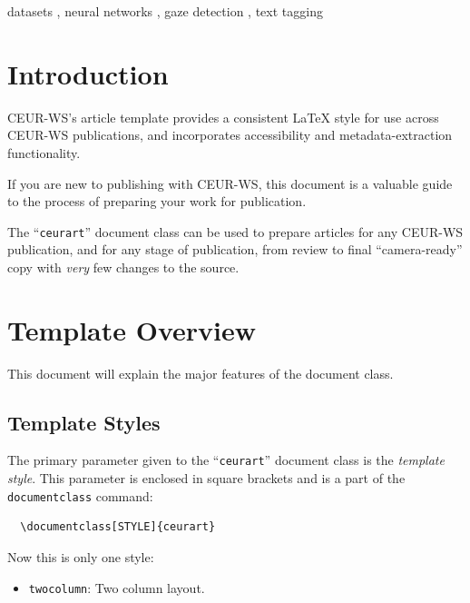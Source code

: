 \documentclass[
]{ceurart}
\begin{document}
\begin{keywords}
  datasets \sep
  neural networks \sep
  gaze detection \sep
  text tagging
\end{keywords}


\maketitle

\section{Introduction}

CEUR-WS's article template provides a consistent \LaTeX{} style for use
across CEUR-WS publications, and incorporates accessibility and
metadata-extraction functionality.

If you are new to publishing with CEUR-WS, this document is a valuable
guide to the process of preparing your work for publication.

The ``\verb|ceurart|'' document class can be used to prepare articles
for any CEUR-WS publication, and for any stage of publication, from
review to final ``camera-ready'' copy with {\itshape very} few changes
to the source.

\section{Template Overview}

This document will explain the major features of the document
class.

\subsection{Template Styles}

The primary parameter given to the ``\verb|ceurart|'' document class is
the \textit{template style}. This parameter is enclosed in square
brackets and is a part of the {\verb|documentclass|} command:
\begin{verbatim}
  \documentclass[STYLE]{ceurart}
\end{verbatim}

Now this is only one style:
\begin{itemize}
\item {\verb|twocolumn|}: Two column layout.
\end{itemize}
\end{document}
